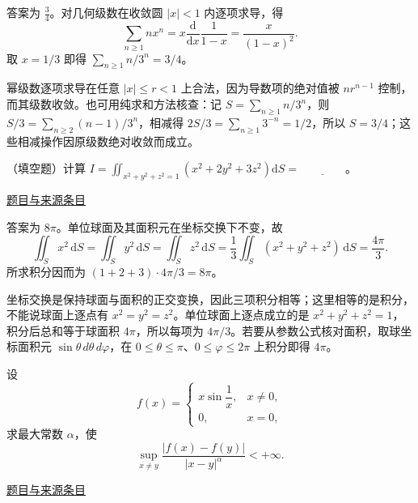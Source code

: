 \documentclass[UTF8,12pt,a4paper,fontset=fandol]{ctexart}
\begin{document}
\begin{solve}\label{ans:fin06-lo:2}

答案为 $\frac34$。对几何级数在收敛圆 $|x|<1$ 内逐项求导，得
\[
\sum_{n\ge1}nx^n=x\frac{\mathrm d}{\mathrm dx}\frac1{1-x}
=\frac{x}{(1-x)^2}.
\]
取 $x=1/3$ 即得 $\sum_{n\ge1}n/3^n=3/4$。

幂级数逐项求导在任意 $|x|\le r<1$ 上合法，因为导数项的绝对值被 $nr^{n-1}$ 控制，而其级数收敛。也可用纯求和方法核查：记 $S=\sum_{n\ge1}n/3^n$，则 $S/3=\sum_{n\ge2}(n-1)/3^n$，相减得 $2S/3=\sum_{n\ge1}3^{-n}=1/2$，所以 $S=3/4$；这些相减操作因原级数绝对收敛而成立。

\end{solve}

\begin{example}[来源序号3]\label{ex:fin06-lo:3}\label{pr:fin06-lo:3}

（填空题）计算 $I=\iint_{x^2+y^2+z^2=1}\left(x^2+2y^2+3z^2\right)\mathrm{d}S=\underline{\qquad\qquad}$。

\par\href{https://github.com/lzxcr/cmc-mathematics/blob/64916fa1fdbc3e444a652eca204d5669058ee321/src/problems/finals/06/03.md}{题目与来源条目}

\end{example}

\begin{solve}\label{ans:fin06-lo:3}

答案为 $8\pi$。单位球面及其面积元在坐标交换下不变，故
\[
\iint_Sx^2\,\mathrm dS=\iint_Sy^2\,\mathrm dS
=\iint_Sz^2\,\mathrm dS
=\frac13\iint_S(x^2+y^2+z^2)\,\mathrm dS=\frac{4\pi}{3}.
\]
所求积分因而为 $(1+2+3)\cdot4\pi/3=8\pi$。

坐标交换是保持球面与面积的正交变换，因此三项积分相等；这里相等的是积分，不能说球面上逐点有 $x^2=y^2=z^2$。单位球面上逐点成立的是 $x^2+y^2+z^2=1$，积分后总和等于球面积 $4\pi$，所以每项为 $4\pi/3$。若要从参数公式核对面积，取球坐标面积元 $\sin\theta\,d\theta\,d\varphi$，在 $0\le\theta\le\pi$、$0\le\varphi\le2\pi$ 上积分即得 $4\pi$。

\end{solve}

\begin{example}[来源序号7]\label{ex:fin06-lo:7}\label{pr:fin06-lo:7}

设
\[
f(x)=\begin{cases}x\sin\dfrac{1}{x},&x\ne0,\\0,&x=0,\end{cases}
\]
求最大常数 $\alpha$，使
\[
\sup_{x\ne y}\frac{|f(x)-f(y)|}{|x-y|^{\alpha}}<+\infty .
\]

\par\href{https://github.com/lzxcr/cmc-mathematics/blob/64916fa1fdbc3e444a652eca204d5669058ee321/src/problems/finals/06/07.md}{题目与来源条目}

\end{example}
\end{document}
